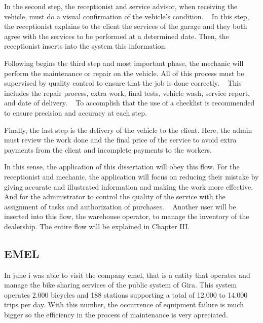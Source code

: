In the second step, the receptionist and service advisor, when receiving the vehicle, must do a visual confirmation of the vehicle's condition. ~\cite{Setting_the_after_sale_process}
In this step, the receptionist explains to the client the services of the garage and they both agree with the services to be performed at a determined date. 
Then, the receptionist inserts into the system this information. ~\cite{Setting_the_after_sale_process}

Following begins the third step and most important phase, the mechanic will perform the maintenance or repair on the vehicle. 
All of this process must be supervised by quality control to ensure that the job is done correctly. ~\cite{Setting_the_after_sale_process}
This includes the repair process, extra work, final tests, vehicle wash, service report, and date of delivery. ~\cite{Setting_the_after_sale_process}
To accomplish that the use of a checklist is recommended to ensure precision and accuracy at each step. ~\cite{Setting_the_after_sale_process}

Finally, the last step is the delivery of the vehicle to the client. 
Here, the admin must review the work done and the final price of the service to avoid extra payments from the client and incomplete payments to the workers. ~\cite{Setting_the_after_sale_process}

In this sense, the application of this dissertation will obey this flow.
For the receptionist and mechanic, the application will focus on reducing their mistake by giving accurate and illustrated information and making the work more effective.
And for the administrator to control the quality of the service with the assignment of tasks and authorization of purchases.  
Another user will be inserted into this flow, the warehouse operator, to manage the inventory of the dealership. 
The entire flow will be explained in Chapter III. 


\subsection{EMEL}
In june  i was able to visit the company \ac{emel}, that is a entity that operates and manage the bike sharing services of the public system of Gira.
This system operates 2.000 bicycles and 188 stations supporting a total of 12.000 to 14.000 trips per day.
With this number, the occurrence of equipment failure is much bigger so the efficiency in the process of maintenance is very apreciated.

